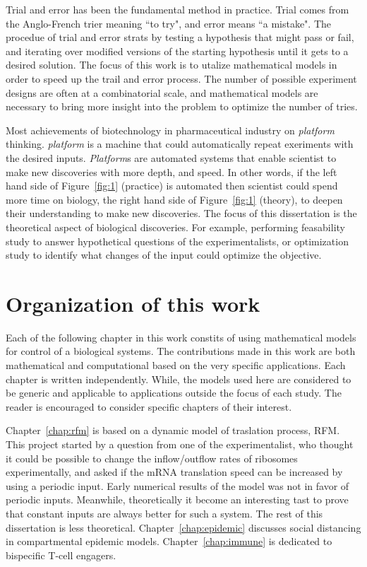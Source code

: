 Trial and error has been the fundamental method in practice. Trial comes from the Anglo-French trier meaning ``to try", and error means ``a mistake". 
The procedue of trial and error strats by testing a hypothesis that might pass or fail, and iterating over modified versions of the starting hypothesis until it gets to a desired solution.
The focus of this work is to utalize mathematical models in order to speed up the trail and error process. 
The number of possible experiment designs are often at a combinatorial scale, and mathematical models are necessary to bring more insight into the problem to optimize the number of tries.

Most achievements of biotechnology in pharmaceutical industry  on \emph{platform} thinking.
\emph{platform} is a machine that could automatically repeat exeriments with the desired inputs.
\emph{Platform}s are automated systems that enable scientist to make new discoveries with more depth, and speed. 
In other words, if the left hand side of Figure~\ref{fig:1} (practice) is automated then scientist could spend more time on biology, the right hand side of Figure~\ref{fig:1} (theory), to deepen their understanding to make new discoveries.
The focus of this dissertation is the theoretical aspect of biological discoveries. 
For example, performing feasability study to answer hypothetical questions of the experimentalists, or optimization study to identify what changes of the input could optimize the objective. 

\section{Organization of this work}

Each of the following chapter in this work constits of using mathematical models for control of a biological systems. 
The contributions made in this work are both mathematical and computational based on the very specific applications.
Each chapter is written independently.
While, the models used here are considered to be generic and applicable to applications outside the focus of each study.
The reader is encouraged to consider specific chapters of their interest.

Chapter~\ref{chap:rfm} is based on a dynamic model of traslation process, \ac{RFM}.
This project started by a question from one of the experimentalist, who thought it could be possible to change the inflow/outflow rates of ribosomes experimentally, and asked if the mRNA translation speed can be increased by using a periodic input. 
Early numerical results of the model was not in favor of periodic inputs.
Meanwhile, theoretically it become an interesting tast to prove that constant inputs are always better for such a system.
The rest of this dissertation is less theoretical.
Chapter~\ref{chap:epidemic} discusses social distancing in compartmental epidemic models.
Chapter~\ref{chap:immune} is dedicated to bispecific T-cell engagers. 
